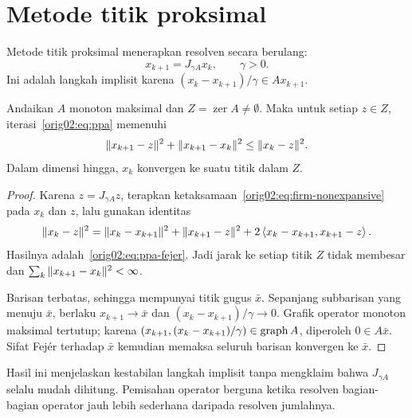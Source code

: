 \section{Metode titik proksimal}
\label{orig02:section:ppa}

Metode titik proksimal menerapkan resolven secara berulang:
\begin{equation}
  \label{orig02:eq:ppa}
  x_{k+1}=J_{\gamma A}x_k,
  \qquad \gamma>0.
\end{equation}
Ini adalah langkah implisit karena
$(x_k-x_{k+1})/\gamma\in Ax_{k+1}$.

\begin{theorem}
  \label{orig02:theorem:ppa}
  Andaikan $A$ monoton maksimal dan
  $Z=\operatorname{zer}A\neq\emptyset$. Maka untuk setiap $z\in Z$,
  iterasi~\eqref{orig02:eq:ppa} memenuhi
  \begin{equation}
    \label{orig02:eq:ppa-fejer}
    \|x_{k+1}-z\|^2+\|x_{k+1}-x_k\|^2
    \leq\|x_k-z\|^2.
  \end{equation}
  Dalam dimensi hingga, $x_k$ konvergen ke suatu titik dalam $Z$.
\end{theorem}
\begin{proof}
  Karena $z=J_{\gamma A}z$, terapkan
  ketaksamaan~\eqref{orig02:eq:firm-nonexpansive} pada $x_k$ dan $z$, lalu
  gunakan identitas
  \begin{equation}
    \|x_k-z\|^2
    =\|x_k-x_{k+1}\|^2+\|x_{k+1}-z\|^2
     +2\left\langle x_k-x_{k+1} , x_{k+1}-z\right\rangle.
  \end{equation}
  Hasilnya adalah~\eqref{orig02:eq:ppa-fejer}. Jadi jarak ke setiap titik
  $Z$ tidak membesar dan
  $\sum_k\|x_{k+1}-x_k\|^2<\infty$.

  Barisan terbatas, sehingga mempunyai titik gugus $\bar x$. Sepanjang
  subbarisan yang menuju $\bar x$, berlaku
  $x_{k+1}\to\bar x$ dan
  $(x_k-x_{k+1})/\gamma\to0$. Grafik operator monoton maksimal tertutup;
  karena $(x_{k+1},(x_k-x_{k+1})/\gamma)\in\operatorname{\mathrm{graph}} A$, diperoleh
  $0\in A\bar x$. Sifat Fej\'er terhadap $\bar x$ kemudian memaksa seluruh
  barisan konvergen ke $\bar x$.
\end{proof}

Hasil ini menjelaskan kestabilan langkah implisit tanpa mengklaim bahwa
$J_{\gamma A}$ selalu mudah dihitung. Pemisahan operator berguna ketika
resolven bagian-bagian operator jauh lebih sederhana daripada resolven
jumlahnya.

